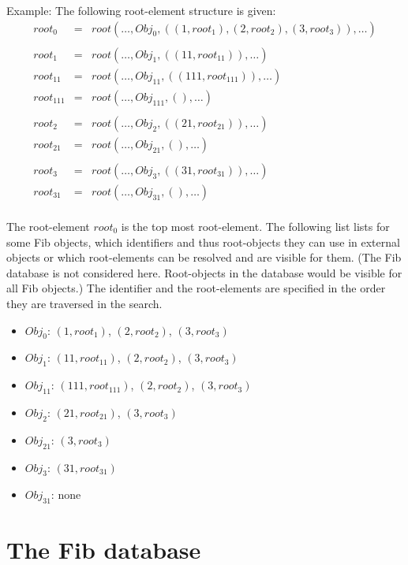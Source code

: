 \bigskip\noindent
Example: The following root-element structure is given:
\begin{eqnarray*}
root_0&=&root( \ldots , Obj_0 , (( 1, root_1), ( 2, root_2), ( 3, root_3)), \ldots )\\
\\
root_1&=&root( \ldots , Obj_1 , (( 11, root_{11})),  \ldots )\\
root_{11}&=&root( \ldots , Obj_{11} , (( 111, root_{111})), \ldots )\\
root_{111}&=&root( \ldots , Obj_{111} , (), \ldots )\\
\\
root_2&=&root( \ldots , Obj_2 , (( 21, root_{21})),  \ldots )\\
root_{21}&=&root( \ldots , Obj_{21} , (), \ldots )\\
\\
root_3&=&root( \ldots , Obj_3 , (( 31, root_{31})),  \ldots )\\
root_{31}&=&root( \ldots , Obj_{31} , (), \ldots )\\
\end{eqnarray*}

The root-element $root_0$ is the top most root-element.
The following list lists for some Fib objects, which identifiers and thus root-objects they can use in external objects or which root-elements can be resolved and are visible for them. (The Fib database is not considered here. Root-objects in the database would be visible for all Fib objects.) The identifier and the root-elements are specified in the order they are traversed in the search.
\begin{itemize}
 \item $Obj_0$: $( 1, root_1)$, $( 2, root_2)$, $( 3, root_3)$
 \item $Obj_1$: $( 11, root_{11})$, $( 2, root_2)$, $( 3, root_3)$
 \item $Obj_{11}$: $( 111, root_{111})$, $( 2, root_2)$, $( 3, root_3)$
 \item $Obj_2$: $( 21, root_{21})$, $( 3, root_3)$
 \item $Obj_{21}$: $( 3, root_3)$
 \item $Obj_3$: $( 31, root_{31})$
 \item $Obj_{31}$: none
\end{itemize}



\section{The Fib database}
\label{secFibDatabase}

